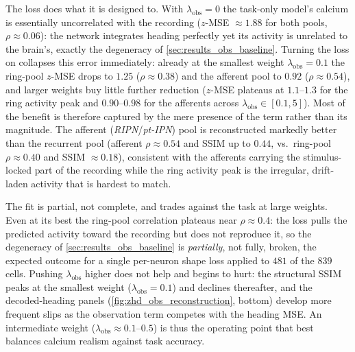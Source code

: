 \documentclass[11pt]{article}
\begin{document}
The loss does what it is designed to. With $\lambda_{\mathrm{obs}} = 0$
the task-only model's calcium is essentially uncorrelated with the
recording ($z$-MSE $\approx 1.88$ for both pools, $\rho \approx 0.06$):
the network integrates heading perfectly yet its activity is unrelated to
the brain's, exactly the degeneracy of \cref{sec:results_obs_baseline}.
Turning the loss on collapses this error immediately: already at the
smallest weight $\lambda_{\mathrm{obs}} = 0.1$ the ring-pool $z$-MSE
drops to $1.25$ ($\rho \approx 0.38$) and the afferent pool to $0.92$
($\rho \approx 0.54$), and larger weights buy little further reduction
($z$-MSE plateaus at $1.1$--$1.3$ for the ring activity peak and $0.90$--$0.98$ for the
afferents across $\lambda_{\mathrm{obs}} \in [0.1, 5]$). Most of the
benefit is therefore captured by the mere presence of the term rather
than its magnitude. The afferent (\emph{RIPN}/\emph{pt-IPN}) pool is
reconstructed markedly better than the recurrent pool (afferent
$\rho \approx 0.54$ and SSIM up to $0.44$, vs.\ ring-pool $\rho \approx 0.40$
and SSIM $\approx 0.18$), consistent with the afferents carrying the
stimulus-locked part of the recording while the ring activity peak is the irregular,
drift-laden activity that is hardest to match.

The fit is partial, not complete, and trades against the task at large
weights. Even at its best the ring-pool correlation plateaus near
$\rho \approx 0.4$: the loss pulls the predicted activity toward the
recording but does not reproduce it, so the degeneracy of
\cref{sec:results_obs_baseline} is \emph{partially}, not fully, broken,
the expected outcome for a single per-neuron shape loss applied to
$481$ of the $839$ cells. Pushing $\lambda_{\mathrm{obs}}$ higher does not
help and begins to hurt: the structural SSIM peaks at the smallest weight
($\lambda_{\mathrm{obs}} = 0.1$) and declines thereafter, and the
decoded-heading panels (\cref{fig:zhd_obs_reconstruction}, bottom)
develop more frequent slips as the observation term competes with the
heading MSE. An intermediate weight
($\lambda_{\mathrm{obs}} \approx 0.1$--$0.5$) is thus the operating point
that best balances calcium realism against task accuracy.
\end{document}
